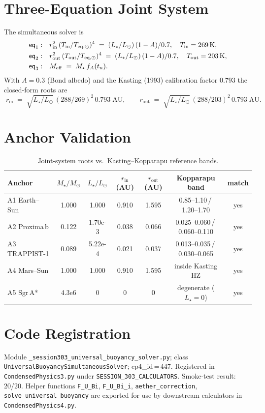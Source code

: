 \documentclass[11pt]{article}
\newcommand{\rin}{r_{\mathrm{in}}}
\newcommand{\rout}{r_{\mathrm{out}}}
\newcommand{\Meff}{M_{\mathrm{eff}}}
\newcommand{\fA}{f_{A}}
\newcommand{\Msun}{M_{\odot}}
\newcommand{\Lsun}{L_{\odot}}
\begin{document}
\section{Three-Equation Joint System}
The simultaneous solver is
\begin{align}
\textsf{eq}_1: &\quad \rin^{2}\,(T_{\rm in}/T_{\rm eq,\odot})^{4}
              \;=\; (L_\star/\Lsun)\,(1-A)/0.7,\quad T_{\rm in}=269\,\mathrm{K},\\
\textsf{eq}_2: &\quad \rout^{2}\,(T_{\rm out}/T_{\rm eq,\odot})^{4}
              \;=\; (L_\star/\Lsun)\,(1-A)/0.7,\quad T_{\rm out}=203\,\mathrm{K},\\
\textsf{eq}_3: &\quad \Meff \;=\; M_\star\,\fA(t_n).
\end{align}
With $A=0.3$ (Bond albedo) and the Kasting (1993) calibration factor $0.793$
the closed-form roots are
\begin{equation}
\boxed{\;\rin \;=\; \sqrt{L_\star/\Lsun}\,(288/269)^{2}\,0.793\;\mathrm{AU},
\qquad
\rout \;=\; \sqrt{L_\star/\Lsun}\,(288/203)^{2}\,0.793\;\mathrm{AU}.\;}
\end{equation}

\section{Anchor Validation}
\begin{table}[h!]
\centering
\begin{tabular}{lcccccc}
\toprule
Anchor & $M_\star/\Msun$ & $L_\star/\Lsun$ & $\rin$ (AU) & $\rout$ (AU)
       & Kopparapu band & match \\
\midrule
A1 Earth--Sun  & 1.000  & 1.000   & 0.910 & 1.595 & 0.85--1.10\,/\,1.20--1.70 & yes \\
A2 Proxima\,b  & 0.122  & 1.70e-3 & 0.038 & 0.066 & 0.025--0.060\,/\,0.060--0.110 & yes \\
A3 TRAPPIST-1  & 0.089  & 5.22e-4 & 0.021 & 0.037 & 0.013--0.035\,/\,0.030--0.065 & yes \\
A4 Mars--Sun   & 1.000  & 1.000   & 0.910 & 1.595 & inside Kasting HZ & yes \\
A5 Sgr\,A*     & 4.3e6  & 0       & 0     & 0     & degenerate ($L_\star=0$) & yes \\
\bottomrule
\end{tabular}
\caption{Joint-system roots vs.\ Kasting--Kopparapu reference bands.}
\end{table}

\section{Code Registration}
Module \texttt{\_session303\_universal\_buoyancy\_solver.py}; class
\texttt{UniversalBuoyancySimultaneousSolver}; cp4\_id\,=\,447. Registered in
\texttt{CondensedPhysics3.py} under \texttt{SESSION\_303\_CALCULATORS}. Smoke-test
result: 20/20. Helper functions \texttt{F\_U\_Bi}, \texttt{F\_U\_Bi\_i},
\texttt{aether\_correction}, \texttt{solve\_universal\_buoyancy} are exported
for use by downstream calculators in \texttt{CondensedPhysics4.py}.
\end{document}
